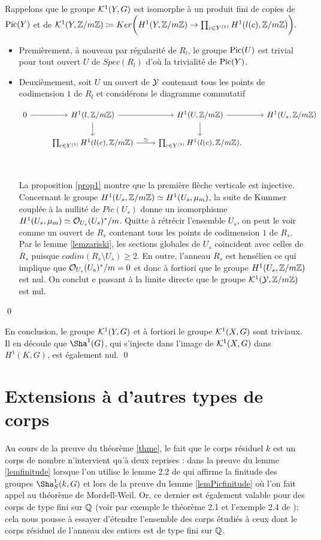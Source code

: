 \documentclass[11pt]{article}
\begin{document}
 \proof Rappelons que le groupe $\mathcal{K}^1(Y, G)$ est isomorphe à un produit fini de copies de $\operatorname{Pic}(Y)$ et de $\CK^1(Y, \Z / m\Z) \coloneqq Ker\bigg (H^1(Y, \Z/m\Z) \ra \prod_{c \in Y^{(1)}} H^1(l(c), \Z /m\Z) \bigg).$
\begin{itemize}
    \item Premièrement, à nouveau par régularité de $R_l$, le groupe $\operatorname{Pic}(U)$ est trivial pour tout ouvert $U$ de $Spec(R_l)$ d'où la trivialité de $\operatorname{Pic}(Y)$.
    \item Deuxièmement, soit $U$ un ouvert de $\mathcal{Y}$ contenant tous les points de codimension $1$ de $R_l$ et considérons le diagramme commutatif

\[\begin{tikzcd}
  0 & H^1(l, \Z/m\Z) & H^1(U, \Z/m\Z)  & H^1(U_s, \Z/m\Z) \\
  & \prod_{c \in Y^{(1)}} H^1(l(c), \Z /m\Z) &   \prod_{c \in Y^{(1)}} H^1(l(c), \Z /m\Z). \\
    \arrow[from=1-1, to=1-2]
    \arrow[from=1-2, to=1-3]
    \arrow[from=1-3, to=1-4]
    \arrow[from=1-2, to=2-2]
    \arrow[from=1-3, to=2-3]
    \arrow[from=2-2, to=2-3, "\simeq"]
\end{tikzcd}\]

La proposition \ref{prop1} montre que la première flèche verticale est injective. Concernant le groupe $H^1(U_s, \mathbb{Z}/m\mathbb{Z}) \simeq H^1(U_s, \mu_m)$, la suite de Kummer couplée à la nullité de $Pic(U_s)$ donne un isomorphisme $H^1(U_s, \mu_m) \simeq \mathcal{O}_{U_s}(U_s)^*/m$. Quitte à rétrécir l'ensemble $U_s$, on peut le voir comme un ouvert de $R_s$ contenant tous les points de codimension $1$ de $R_s$. Par le lemme \ref{lemzariski}, les sections globales de $U_s$ coïncident avec celles de $R_s$ puisque $codim(R_s \setminus U_s) \geq 2$. En outre, l'anneau $R_s$ est hensélien ce qui implique que  $\mathcal{O}_{U_s}(U_s)^*/m = 0$ et donc à fortiori que le groupe $H^1(U_s, \mathbb{Z}/m\mathbb{Z})$ est nul. On conclut e passant à la limite directe que le groupe $\mathcal{K}^1(\mathcal{Y}, \mathbb{Z} / m\mathbb{Z})$ est nul.
\end{itemize} \qed

En conclusion, le groupe $\mathcal{K}^1(Y, G)$ et à fortiori le groupe $\mathcal{K}^1(X, G)$ sont triviaux. Il en découle que $\Sha^1(G)$, qui s'injecte dans l'image de $\mathcal{K}^1(X, G)$ dans $H^1(K,G)$, est également nul. \qed \\


 

\section{Extensions à d'autres types de corps}
Au cours de la preuve du théorème \ref{thme}, le fait que le corps résiduel $k$ est un corps de nombre n'intervient qu'à deux reprises : dans la preuve du lemme \ref{lemfinitude} lorsque l'on utilise le lemme 2.2 de \cite{HarSza} qui affirme la finitude des groupes $\Sha^1_S(k,G)$ et lors de la preuve du lemme \ref{lemPicfinitude} où l'on fait appel au théorème de Mordell-Weil. Or, ce dernier est également valable pour des corps de type fini sur $\mathbb{Q}$ (voir par exemple le théorème 2.1 et l'exemple 2.4 de \cite{Conrad}); cela nous pousse à essayer d'étendre l'ensemble des corps étudiés à ceux dont le corps résiduel de l'anneau des entiers est de type fini sur $\mathbb{Q}$.
\end{document}
